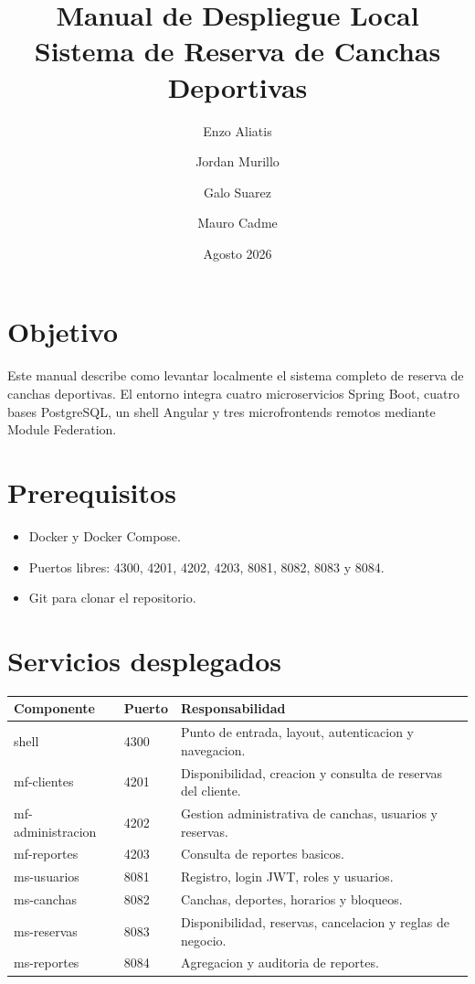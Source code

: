 \documentclass[12pt,a4paper]{article}
\title{Manual de Despliegue Local\\Sistema de Reserva de Canchas Deportivas}
\author{Enzo Aliatis \and Jordan Murillo \and Galo Suarez \and Mauro Cadme}
\date{Agosto 2026}
\begin{document}
\maketitle

\section{Objetivo}

Este manual describe como levantar localmente el sistema completo de reserva de canchas deportivas. El entorno integra cuatro microservicios Spring Boot, cuatro bases PostgreSQL, un shell Angular y tres microfrontends remotos mediante Module Federation.

\section{Prerequisitos}

\begin{itemize}
  \item Docker y Docker Compose.
  \item Puertos libres: 4300, 4201, 4202, 4203, 8081, 8082, 8083 y 8084.
  \item Git para clonar el repositorio.
\end{itemize}

\section{Servicios desplegados}

\begin{longtable}{p{4cm}p{3cm}p{6cm}}
\textbf{Componente} & \textbf{Puerto} & \textbf{Responsabilidad} \\
\hline
shell & 4300 & Punto de entrada, layout, autenticacion y navegacion. \\
mf-clientes & 4201 & Disponibilidad, creacion y consulta de reservas del cliente. \\
mf-administracion & 4202 & Gestion administrativa de canchas, usuarios y reservas. \\
mf-reportes & 4203 & Consulta de reportes basicos. \\
ms-usuarios & 8081 & Registro, login JWT, roles y usuarios. \\
ms-canchas & 8082 & Canchas, deportes, horarios y bloqueos. \\
ms-reservas & 8083 & Disponibilidad, reservas, cancelacion y reglas de negocio. \\
ms-reportes & 8084 & Agregacion y auditoria de reportes. \\
\end{longtable}
\end{document}
